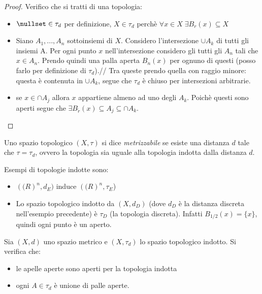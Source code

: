 \begin{proof}
Verifico che si tratti di una topologia:
\begin{itemize}
\item $\nullset \in \tau_d$ per definizione, $X \in \tau_d$ perchè $\forall x \in X \; \exists B_r(x) \subseteq X$
\item Siano $A_1,...,A_n$ sottoinsiemi di $X$. Considero l'intersezione $\cup A_k$ di tutti gli insiemi A. Per ogni punto $x$ nell'intersezione considero gli tutti gli $A_n$ tali che $x \in A_n$. Prendo quindi una palla aperta $B_n(x)$ per ognuno di questi (posso farlo per definizione di $\tau_d$).//
Tra queste prendo quella con raggio minore: questa è contenuta in $\cup A_k$, segue che $\tau_d$ è chiuso per intersezioni arbitrarie.
\item se $x \in \cap A_j$ allora $x$ appartiene almeno ad uno degli $A_k$. Poichè questi sono aperti segue che  $\exists B_{\tilde r} (x) \subseteq A_j \subseteq \cap A_k$.
\end{itemize}
\end{proof}

\begin{defn}
Uno spazio topologico $(X,\tau)$ si dice \textit{metrizzabile} se esiste una distanza $d$ tale che $\tau=\tau_d$, ovvero la topologia sia uguale alla topologia indotta dalla distanza $d$.
\end{defn}

\begin{es}
Esempi di topologie indotte sono:
\begin{itemize}
\item $(\mathbb(R)^n,d_E)$  induce $(\mathbb(R)^n,\tau_E$)
\item Lo spazio topologico indotto da $(X,d_D)$ (dove $d_D$ è la distanza discreta nell'esempio precedente) è $\tau_D$ (la topologia discreta). Infatti $B_{1/2}(x) = \{x\}$, quindi ogni punto è un aperto.
\end{itemize}
\end{es}

\begin{prop}
Sia $(X,d)$ uno spazio metrico e $(X,\tau_d)$ lo spazio topologico indotto. Si  verifica che:
\begin{itemize}
\item le apelle aperte sono aperti per la topologia indotta
\item ogni $A \in \tau_d$ è unione di palle aperte.
\end{itemize}
\end{prop}

